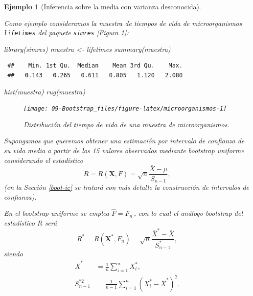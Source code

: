 \documentclass[
  10pt,
]{book}
\newenvironment{Shaded}{\begin{snugshade}}{\end{snugshade}}
\newcommand{\FunctionTok}[1]{\textcolor[rgb]{0.00,0.00,0.00}{#1}}
\newcommand{\NormalTok}[1]{#1}
\newcommand{\OtherTok}[1]{\textcolor[rgb]{0.56,0.35,0.01}{#1}}
\renewcommand{\mathbf}[1]{\symbf{#1}}
\theoremstyle{break}
\newtheorem{example}{Ejemplo}[chapter]
\theoremstyle{nonumberplain}
\begin{document}
\begin{example}[Inferencia sobre la media con varianza desconocida]
\protect\hypertarget{exm:media-dt-desconocida}{}\label{exm:media-dt-desconocida}

Como ejemplo consideramos la muestra de tiempos de vida de microorganismos \texttt{lifetimes} del paquete \texttt{simres} {[}Figura \ref{fig:microorganismos}{]}:

\begin{Shaded}
\begin{Highlighting}[]
\FunctionTok{library}\NormalTok{(simres)}
\NormalTok{muestra }\OtherTok{\textless{}{-}}\NormalTok{ lifetimes}
\FunctionTok{summary}\NormalTok{(muestra)}
\end{Highlighting}
\end{Shaded}

\begin{verbatim}
 ##    Min. 1st Qu.  Median    Mean 3rd Qu.    Max. 
 ##   0.143   0.265   0.611   0.805   1.120   2.080
\end{verbatim}

\begin{Shaded}
\begin{Highlighting}[]
\FunctionTok{hist}\NormalTok{(muestra)}
\FunctionTok{rug}\NormalTok{(muestra)}
\end{Highlighting}
\end{Shaded}

\begin{figure}[!htbp]

{\centering \texttt{[image: 09-Bootstrap\_files/figure-latex/microorganismos-1]} 

}

\caption{Distribución del tiempo de vida de una muestra de microorganismos.}\label{fig:microorganismos}
\end{figure}

Supongamos que queremos obtener una estimación por intervalo de confianza de su vida media a partir de los 15 valores observados mediante bootstrap uniforme considerando el estadístico
\[R=R\left( \mathbf{X},F \right) =\sqrt{n}\frac{\bar{X}-\mu }{S_{n-1}},\]
(en la Sección \ref{boot-ic} se tratará con más detalle la construcción de intervalos de confianza).

En el bootstrap uniforme se emplea \(\hat{F}=F_n\,\), con lo cual el análogo bootstrap del estadístico \(R\) será
\[R^{\ast}=R\left( \mathbf{X}^{\ast},F_n \right) =\sqrt{n}\frac{\bar{X}^{\ast}-\bar{X}}{S_{n-1}^{\ast}},\]
siendo
\[\begin{aligned}
\bar{X}^{\ast} &= \frac{1}{n}\sum_{i=1}^{n}X_i^{\ast}, \\
S_{n-1}^{\ast 2} &= \frac{1}{n-1}\sum_{i=1}^{n}\left( X_i^{\ast}-
\bar{X}^{\ast} \right)^2.
\end{aligned}\]


\end{example}
\end{document}

